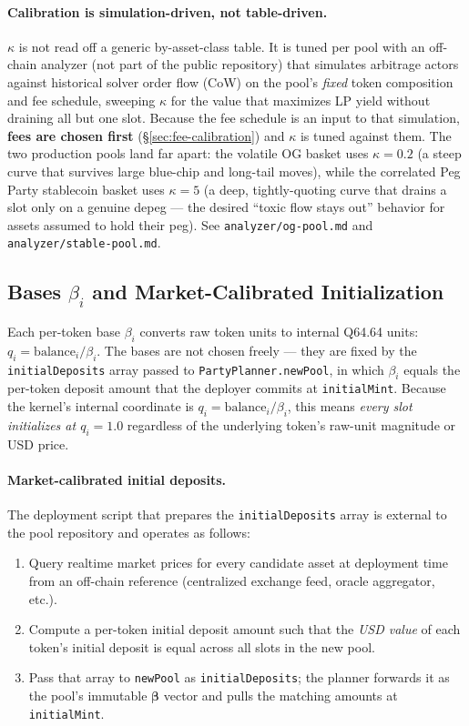 \documentclass[11pt]{article}
\begin{document}
\paragraph{Calibration is simulation-driven, not table-driven.}
$\kappa$ is not read off a generic by-asset-class table. It is tuned
per pool with an off-chain analyzer (not part of the public repository)
that simulates arbitrage actors against historical solver order flow
(CoW) on the pool's \emph{fixed} token composition and fee schedule,
sweeping $\kappa$ for the value that maximizes LP yield without draining
all but one slot. Because the fee schedule is an input to that
simulation, \textbf{fees are chosen first} (\S\ref{sec:fee-calibration})
and $\kappa$ is tuned against them. The two production pools land far
apart: the volatile OG basket uses $\kappa = 0.2$ (a steep curve that
survives large blue-chip and long-tail moves), while the correlated
Peg Party stablecoin basket uses $\kappa = 5$ (a deep, tightly-quoting
curve that drains a slot only on a genuine depeg --- the desired
``toxic flow stays out'' behavior for assets assumed to hold their
peg). See \texttt{analyzer/og-pool.md} and
\texttt{analyzer/stable-pool.md}.

\subsection{Bases $\beta_i$ and Market-Calibrated Initialization}
\label{sec:bases}

Each per-token base $\beta_i$ converts raw token units to internal Q64.64
units: $q_i = \mathrm{balance}_i / \beta_i$. The bases are not chosen
freely --- they are fixed by the \texttt{initialDeposits} array passed to
\texttt{PartyPlanner.newPool}, in which $\beta_i$ equals the per-token
deposit amount that the deployer commits at \texttt{initialMint}. Because
the kernel's internal coordinate is $q_i = \mathrm{balance}_i / \beta_i$,
this means \emph{every slot initializes at $q_i = 1.0$} regardless of the
underlying token's raw-unit magnitude or USD price.

\paragraph{Market-calibrated initial deposits.}
The deployment script that prepares the \texttt{initialDeposits} array
is external to the pool repository and operates as follows:

\begin{enumerate}
  \item Query realtime market prices for every candidate asset at
        deployment time from an off-chain reference (centralized exchange
        feed, oracle aggregator, etc.).
  \item Compute a per-token initial deposit amount such that the
        \emph{USD value} of each token's initial deposit is equal across
        all slots in the new pool.
  \item Pass that array to \texttt{newPool} as \texttt{initialDeposits};
        the planner forwards it as the pool's immutable $\boldsymbol{\beta}$
        vector and pulls the matching amounts at \texttt{initialMint}.
\end{enumerate}
\end{document}
